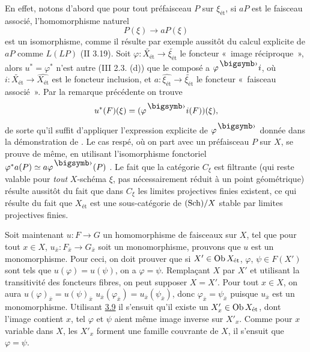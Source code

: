 \documentclass[10pt]{../fichiers-configuration-latex/smfart}
\begin{document}
En effet, notons d'abord que pour tout préfaisceau $P$ sur
$\xi_{\text{ét}}$,
si $aP$ est le faisceau associé, l'homomorphisme naturel
$$
P(\xi) \to aP(\xi)
$$
est un isomorphisme, comme il résulte par exemple aussitôt du
calcul explicite de\pageoriginale  $aP$ comme $L(LP)$ (II 3.19). Soit
$\varphi :
\widetilde{X_{\text{ét}}} \to \widetilde{\xi_{\text{ét}}}$ le foncteur « image réciproque », alors $u^{\ast} = \varphi^{\ast}$ n'est autre
(III 2.3. (d)) que le composé a $\varphi^{\bigdot} i$, où $i :
\widetilde{X_{\text{ét}}} \to \widehat{X_{\text{ét}}}$
est le foncteur inclusion, et $a :
\widehat{\xi_{\text{ét}}} \to
\widetilde{\xi_{\text{ét}}}$ le foncteur « faisceau
associé ». Par la remarque précédente on trouve
$$
u^{\ast} (F) (\xi) = (\varphi^{\bigdot} i(F)) (\xi){\quoi},
$$
de sorte qu'il suffit d'appliquer l'expression explicite de
$\varphi^{\bigdot}$ donnée dans la démonstration de . %
Le cas respé, où on part avec un préfaisceau $P$ sur $X$, se prouve de même, en
utilisant l'isomorphisme fonctoriel $\varphi^{\ast} a(P) \simeq a
\varphi^{\bigdot} (P)$ . %
Le fait que la catégorie $C_{\xi}$ est filtrante (qui reste valable pour \emph{tout} $X$-schéma $\xi$, pas
nécessairement réduit à un point géométrique)
résulte aussitôt du
fait que dans $C_{\xi}$ les limites projectives finies existent, ce
qui résulte du fait que $X_{\text{ét}}$ est une sous-catégorie de
$(\operatorname{Sch}) /X$ stable par limites projectives finies.

Soit maintenant $u : F \to G$ un homomorphisme de faisceaux sur $X$,
tel que pour tout $x \in X$, $u_{\bar{x}} : F_{\bar{x}} \to
G_{\bar{x}}$ soit un monomorphisme, prouvons que $u$ est un
monomorphisme. Pour ceci, on doit prouver que si $X'\in \operatorname{Ob}
X_{\text{ét}}$, $\varphi$, $\psi \in F(X')$ sont tels que $u
(\varphi) = u (\psi)$, on a $\varphi = \psi$. Remplaçant $X$ par
$X'$ et utilisant la transitivité des foncteurs fibres, on peut
supposer $X = X'$. Pour tout $x \in X$, on aura $u
(\varphi)_{\bar{x}} = u (\psi)_{\bar{x}}$ \ie $u_{\bar{x}}
(\varphi_{\bar{x}}) = u_{\bar{x}} (\psi_{\bar{x}})$, donc
$\varphi_{\bar{x}} = \psi_{\bar{x}}$ puisque $u_{\bar{x}}$ est un
monomorphisme. Utilisant \hyperref[VIII.prop3.9]{3.9} %
il s'ensuit qu'il existe un $X'_x \in \operatorname{Ob} X_{\text{ét}}$, dont l'image contient $x$, tel
$\varphi$ et $\psi$ aient même image inverse sur $X'_x$. Comme pour
$x$ variable dans $X$, les $X'_x$ forment une famille couvrante de
$X$, il s'ensuit que $\varphi = \psi$.
\end{document}
